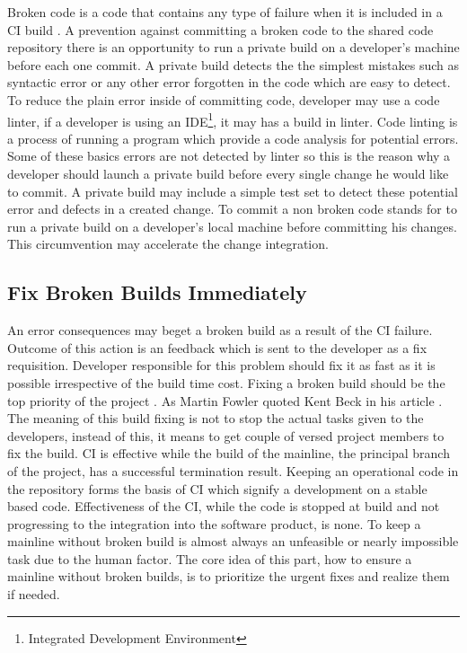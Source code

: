 Broken code is a code that contains any type of failure when it is included in a CI build \cite{CIQualityFramework}. A prevention against committing a broken code to the shared code repository there is an opportunity to run a private build on a developer's machine before each one commit. A private build detects the the simplest mistakes such as syntactic error or any other error forgotten in the code which are easy to detect. To reduce the plain error inside of committing code, developer may use a code linter, if a developer is using an IDE\footnote{Integrated Development Environment}, it may has a build in linter. Code linting is a process of running a program which provide a code analysis for potential errors. Some of these basics errors are not detected by linter so this is the reason why a developer should launch a private build before every single change he would like to commit. A private build may include a simple test set to detect these potential error and defects in a created change. To commit a non broken code stands for to run a private build on a developer's local machine before committing his changes. This circumvention may accelerate the change integration.

\subsection{Fix Broken Builds Immediately}

An error consequences may beget a broken build as a result of the CI failure. Outcome of this action is an feedback which is sent to the developer as a fix requisition. Developer responsible for this problem should fix it as fast as it is possible irrespective of the build time cost. Fixing a broken build should be the top priority of the project \cite{CIQualityFramework}. As Martin Fowler quoted Kent Beck in his article  \cite{MartinFowler}. The meaning of this build fixing is not to stop the actual tasks given to the developers, instead of this, it means to get couple of versed project members to fix the build. CI is effective while the build of the mainline, the principal branch of the project, has a successful termination result. Keeping an operational code in the repository forms the basis of CI which signify a development on a stable based code. Effectiveness of the CI, while the code is stopped at build and not progressing to the integration into the software product, is none. To keep a mainline without broken build is almost always an unfeasible or nearly impossible task due to the human factor. The core idea of this part, how to ensure a mainline without broken builds, is to prioritize the urgent fixes and realize them if needed.\\

